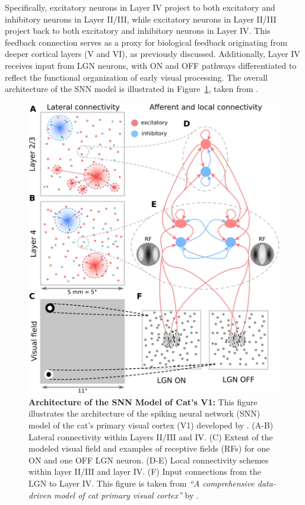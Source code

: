 Specifically, excitatory neurons in Layer IV project to both excitatory and inhibitory neurons in Layer II/III, while excitatory neurons in Layer II/III project back to both excitatory and inhibitory neurons in Layer IV. This feedback connection serves as a proxy for biological feedback originating from deeper cortical layers (V and VI), as previously discussed. Additionally, Layer IV receives input from LGN neurons, with ON and OFF pathways differentiated to reflect the functional organization of early visual processing. The overall architecture of the SNN model is illustrated in Figure~\ref{fig:snn_model_architecture}, taken from \citet{antolik2024comprehensive}.

\begin{figure}
    \centering
    \includegraphics[width=\linewidth]{img/snn_model_architecture.pdf}
    \caption{\textbf{Architecture of the SNN Model of Cat's V1:} This figure illustrates the architecture of the spiking neural network (SNN) model of the cat's primary visual cortex (V1) developed by \citet{antolik2024comprehensive}. (A-B) Lateral connectivity within Layers II/III and IV. (C) Extent of the modeled visual field and examples of receptive fields (RFs) for one ON and one OFF LGN neuron. (D-E) Local connectivity schemes within layer II/III and layer IV. (F) Input connections from the LGN to Layer IV. This figure is taken from \emph{“A comprehensive data-driven model of cat primary visual cortex”} by \citet{antolik2024comprehensive}.}
    \label{fig:snn_model_architecture}
\end{figure}


